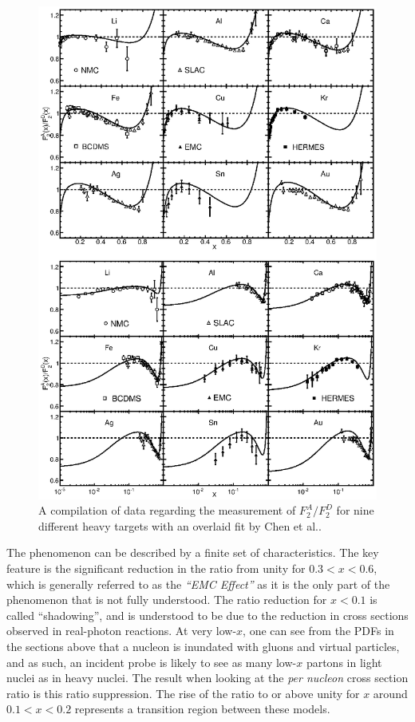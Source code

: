 \begin{figure}
	\centering
	\includegraphics[height=0.9\textheight]{figures/background/emc-all-targ.eps}
	\caption{A compilation of data regarding the measurement of $F^A_2/F_2^D$ for nine different heavy targets with an overlaid fit by Chen et al.\cite{Chen:2013oga}.}
	\label{fig:emc-all-targ}
\end{figure}


The phenomenon can be described by a finite set of characteristics. The key feature is the significant reduction in the ratio from unity for $0.3<x<0.6$, which is generally referred to as the \emph{``EMC Effect''}\cite{Geesaman:1995yd} as it is the only part of the phenomenon that is not fully understood. The ratio reduction for $x<0.1$ is called ``shadowing'', and is understood to be due to the reduction in cross sections observed in real-photon reactions. At very low-$x$, one can see from the PDFs in the sections above that a nucleon is inundated with gluons and virtual particles, and as such, an incident probe is likely to see as many low-$x$ partons in light nuclei as in heavy nuclei. The result when looking at the \emph{per nucleon} cross section ratio is this ratio suppression. The rise of the ratio to or above unity for $x$ around $0.1<x<0.2$ represents a transition region between these models.

